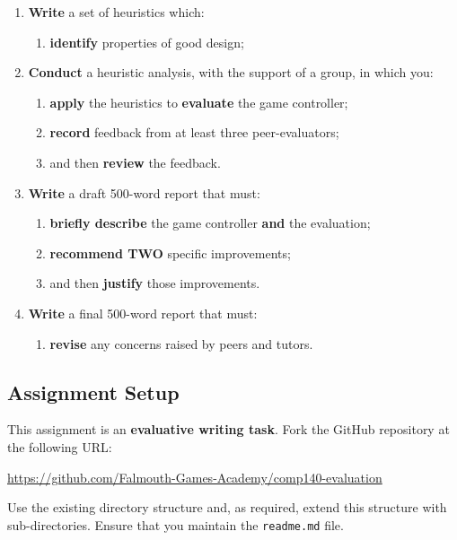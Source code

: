 \documentclass{../fal_assignment}
\begin{document}
\begin{enumerate}[label=(\alph*)]
    \item \textbf{Write} a set of heuristics which:
    	\begin{enumerate}[label=\roman*.]
    		\item \textbf{identify} properties of good design;
	\end{enumerate}
    \item \textbf{Conduct} a heuristic analysis, with the support of a group, in which you:
    	\begin{enumerate}[label=\roman*.]
    		\item \textbf{apply} the heuristics to \textbf{evaluate} the game controller;
      		\item \textbf{record} feedback from at least three peer-evaluators;
    		\item and then \textbf{review} the feedback.
	\end{enumerate}
    \item \textbf{Write} a draft 500-word report that must:
    	\begin{enumerate}[label=\roman*.]
    		\item \textbf{briefly describe} the game controller \textbf{and} the evaluation;    
    		\item \textbf{recommend TWO} specific improvements;	
    		\item and then \textbf{justify} those improvements.
	\end{enumerate}
    \item \textbf{Write} a final 500-word report that must:
    	\begin{enumerate}[label=\roman*.]
    	          \item \textbf{revise} any concerns raised by peers and tutors. 
	\end{enumerate}
\end{enumerate}

\subsection*{Assignment Setup}

This assignment is an \textbf{evaluative writing task}. Fork the GitHub repository at the following URL:

\indent \url{https://github.com/Falmouth-Games-Academy/comp140-evaluation}

Use the existing directory structure and, as required, extend this structure with sub-directories. Ensure that you maintain the \texttt{readme.md} file.
\end{document}

